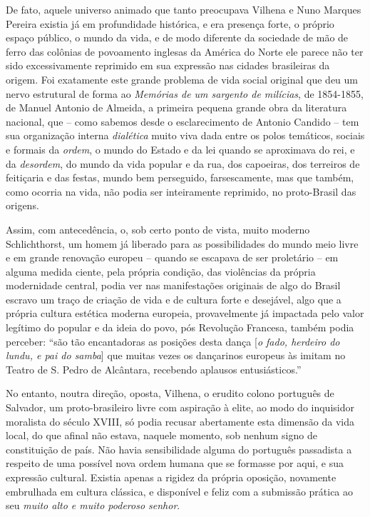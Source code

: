 De fato, aquele universo animado que tanto preocupava Vilhena e Nuno
Marques Pereira existia já em profundidade histórica, e era presença
forte, o próprio espaço público, o mundo da vida, e de modo diferente da
sociedade de mão de ferro das colônias de povoamento inglesas da América
do Norte ele parece não ter sido excessivamente reprimido em sua
expressão nas cidades brasileiras da origem. Foi exatamente este grande
problema de vida social original que deu um nervo estrutural de forma ao
\emph{Memórias de um sargento de milícias}, de 1854-1855, de Manuel
Antonio de Almeida, a primeira pequena grande obra da literatura
nacional, que -- como sabemos desde o esclarecimento de Antonio Candido
-- tem sua organização interna \emph{dialética} muito viva dada entre os
polos temáticos, sociais e formais da \emph{ordem}, o mundo do Estado e
da lei quando se aproximava do rei, e da \emph{desordem}, do mundo da
vida popular e da rua, dos capoeiras, dos terreiros de feitiçaria e das
festas, mundo bem perseguido, farsescamente, mas que também, como
ocorria na vida, não podia ser inteiramente reprimido, no proto-Brasil
das origens.

Assim, com antecedência, o, sob certo ponto de vista, muito moderno
Schlichthorst, um homem já liberado para as possibilidades do mundo meio
livre e em grande renovação europeu -- quando se escapava de ser
proletário -- em alguma medida ciente, pela própria condição, das
violências da própria modernidade central, podia ver nas manifestações
originais de algo do Brasil escravo um traço de criação de vida e de
cultura forte e desejável, algo que a própria cultura estética moderna
europeia, provavelmente já impactada pelo valor legítimo do popular e da
ideia do povo, pós Revolução Francesa, também podia perceber: ``são tão
encantadoras as posições desta dança {[}\emph{o fado, herdeiro do lundu,
e pai do samba}{]} que muitas vezes os dançarinos europeus às imitam no
Teatro de S. Pedro de Alcântara, recebendo aplausos entusiásticos.''

No entanto, noutra direção, oposta, Vilhena, o erudito colono português
de Salvador, um proto-brasileiro livre com aspiração à elite, ao modo do
inquisidor moralista do século XVIII, só podia recusar abertamente esta
dimensão da vida local, do que afinal não estava, naquele momento, sob
nenhum signo de constituição de país. Não havia sensibilidade alguma do
português passadista a respeito de uma possível nova ordem humana que se
formasse por aqui, e sua expressão cultural. Existia apenas a rigidez da
própria oposição, novamente embrulhada em cultura clássica, e disponível
e feliz com a submissão prática ao seu \emph{muito alto e muito poderoso
senhor}.


